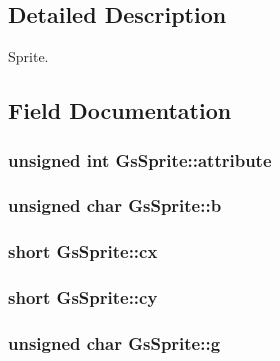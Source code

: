 \subsection{Detailed Description}
Sprite. 

\subsection{Field Documentation}
\hypertarget{structGsSprite_a38d044e1d2010483d2a2afccce099674}{}
\subsubsection[{attribute}]{\setlength{\rightskip}{0pt plus 5cm}unsigned int Gs\+Sprite\+::attribute}\label{structGsSprite_a38d044e1d2010483d2a2afccce099674}
\hypertarget{structGsSprite_a331ea5fed7c5dd3d049d3c05a6e8168b}{}
\subsubsection[{b}]{\setlength{\rightskip}{0pt plus 5cm}unsigned char Gs\+Sprite\+::b}\label{structGsSprite_a331ea5fed7c5dd3d049d3c05a6e8168b}
\hypertarget{structGsSprite_a503442e464a4e8174ad381b78da8d6bf}{}
\subsubsection[{cx}]{\setlength{\rightskip}{0pt plus 5cm}short Gs\+Sprite\+::cx}\label{structGsSprite_a503442e464a4e8174ad381b78da8d6bf}
\hypertarget{structGsSprite_ab181813aca32de73f42adf7032eeca67}{}
\subsubsection[{cy}]{\setlength{\rightskip}{0pt plus 5cm}short Gs\+Sprite\+::cy}\label{structGsSprite_ab181813aca32de73f42adf7032eeca67}
\hypertarget{structGsSprite_ae0775157cf6148b986fe581ba7cb4216}{}
\subsubsection[{g}]{\setlength{\rightskip}{0pt plus 5cm}unsigned char Gs\+Sprite\+::g}\label{structGsSprite_ae0775157cf6148b986fe581ba7cb4216}
\hypertarget{structGsSprite_a90c08fcc2c8d6402cd1a21c863d8aa78}{}
